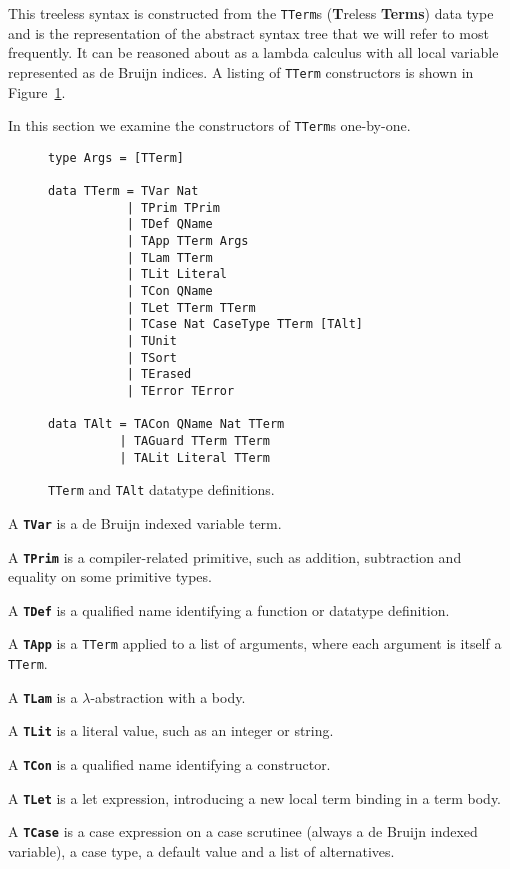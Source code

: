 This treeless syntax is constructed from the \lstinline{TTerm}s (\textbf{T}reless \textbf{Terms}) data type and is the representation of the abstract syntax tree that we will refer to most frequently. It can be reasoned about as a lambda calculus with all local variable represented as de Bruijn indices. A listing of \lstinline{TTerm} constructors is shown in Figure~\ref{code:TTerm}.

In this section we examine the constructors of \lstinline{TTerm}s one-by-one.\citep{agdahackage}

\begin{figure}[h]
\begin{lstlisting}[style=blockhaskell]
type Args = [TTerm]

data TTerm = TVar Nat
           | TPrim TPrim
           | TDef QName
           | TApp TTerm Args
           | TLam TTerm
           | TLit Literal
           | TCon QName
           | TLet TTerm TTerm
           | TCase Nat CaseType TTerm [TAlt]
           | TUnit
           | TSort
           | TErased
           | TError TError

data TAlt = TACon QName Nat TTerm
          | TAGuard TTerm TTerm
          | TALit Literal TTerm
\end{lstlisting}
\caption{\lstinline{TTerm} and \lstinline{TAlt} datatype definitions.}
\label{code:TTerm}
\end{figure}

A \textbf{\lstinline{TVar}} is a de Bruijn indexed variable term.

A \textbf{\lstinline{TPrim}} is a compiler-related primitive, such as addition, subtraction and equality on some primitive types.

A \textbf{\lstinline{TDef}} is a qualified name identifying a function or datatype definition.

A \textbf{\lstinline{TApp}} is a \lstinline{TTerm} applied to a list of arguments, where each argument is itself a \lstinline{TTerm}.

A \textbf{\lstinline{TLam}} is a $\lambda$-abstraction with a body.

A \textbf{\lstinline{TLit}} is a literal value, such as an integer or string.

A \textbf{\lstinline{TCon}} is a qualified name identifying a constructor.

A \textbf{\lstinline{TLet}} is a let expression, introducing a new local term binding in a term body.

A \textbf{\lstinline{TCase}} is a case expression on a case scrutinee (always a de Bruijn indexed variable), a case type, a default value and a list of alternatives.

